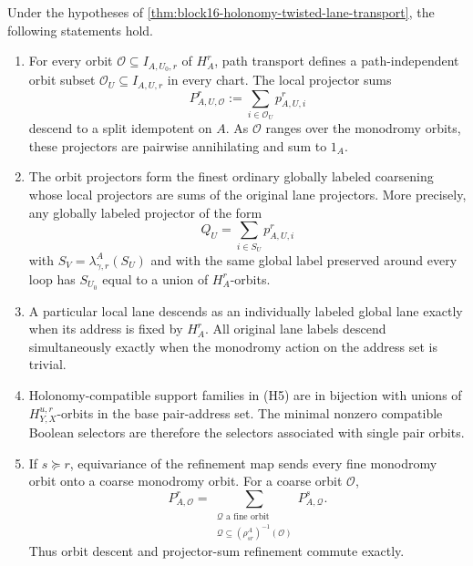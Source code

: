 \begin{theorem}
\label{thm:block16-orbit-descent}
Under the hypotheses of
\cref{thm:block16-holonomy-twisted-lane-transport}, the following statements
hold.

\begin{enumerate}[label=\textup{(O\arabic*)}]
\item For every orbit \(\mathcal O\subseteq I_{A,U_0,r}\) of \(H_A^r\), path
transport defines a path-independent orbit subset
\(\mathcal O_U\subseteq I_{A,U,r}\) in every chart.  The local projector sums
\[
 P^r_{A,U,\mathcal O}
 :=
 \sum_{i\in\mathcal O_U}p^r_{A,U,i}
\]
descend to a split idempotent on \(A\).  As \(\mathcal O\) ranges over the
monodromy orbits, these projectors are pairwise annihilating and sum to
\(1_A\).

\item The orbit projectors form the finest ordinary globally labeled
coarsening whose local projectors are sums of the original lane projectors.
More precisely, any globally labeled projector of the form
\[
 Q_U=\sum_{i\in S_U}p^r_{A,U,i}
\]
with \(S_V=\lambda^A_{\gamma,r}(S_U)\) and with the same global label preserved
around every loop has \(S_{U_0}\) equal to a union of \(H_A^r\)-orbits.

\item A particular local lane descends as an individually labeled global lane
exactly when its address is fixed by \(H_A^r\).  All original lane labels
descend simultaneously exactly when the monodromy action on the address set is
trivial.

\item Holonomy-compatible support families in (H5) are in bijection with
unions of \(H_{Y,X}^{u,r}\)-orbits in the base pair-address set.  The minimal
nonzero compatible Boolean selectors are therefore the selectors associated
with single pair orbits.

\item If \(s\succeq r\), equivariance of the refinement map sends every fine
monodromy orbit onto a coarse monodromy orbit.  For a coarse orbit
\(\mathcal O\),
\[
 P^r_{A,\mathcal O}
 =
 \sum_{\substack{\mathcal Q\text{ a fine orbit}\\
 \mathcal Q\subseteq(\rho^A_{sr})^{-1}(\mathcal O)}}
 P^s_{A,\mathcal Q}.
\]
Thus orbit descent and projector-sum refinement commute exactly.
\end{enumerate}
\end{theorem}

